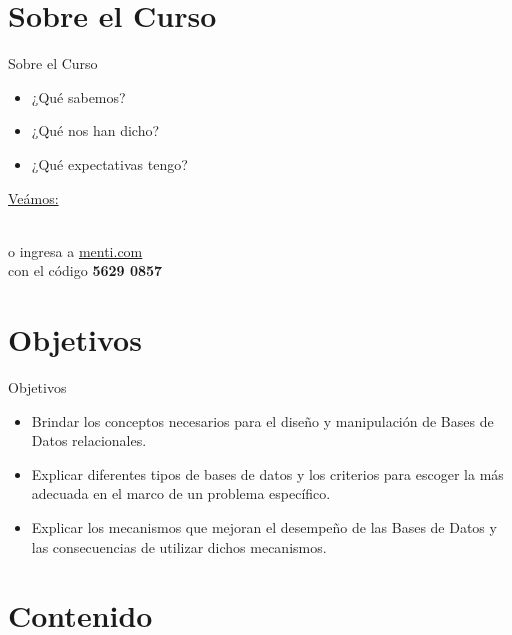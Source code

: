 \documentclass[aspectratio=169]{beamer}
\begin{document}
\section{Sobre el Curso}

\begin{frame}{Sobre el Curso}
\begin{itemize}
    \item ¿Qué sabemos?
    \item ¿Qué nos han dicho?
    \item ¿Qué expectativas tengo?
\end{itemize}

    \centering
    \vspace{10mm}
    {\small \href{https://www.mentimeter.com/app/presentation/aljzuorbyosmeh7v9vvh4ik9e9y3zdcn/edit}{Veámos:}}\\
    \vspace{2mm}
  
    \\
    \vspace{2mm}
    \footnotesize  o ingresa a \href{https://www.menti.com/alqgaa5yhyd4}{menti.com}\\ con el código \textbf{5629 0857}
\end{frame}

\section{Objetivos}

\begin{frame}{Objetivos}
\begin{itemize}
    \item Brindar los conceptos necesarios para el diseño y manipulación de Bases de Datos relacionales.
    \item Explicar diferentes tipos de bases de datos y los criterios para escoger la más adecuada en el marco de un problema específico.
    \item Explicar los mecanismos que mejoran el desempeño de las Bases de Datos y las consecuencias de utilizar dichos mecanismos.
\end{itemize}
\end{frame}

\section{Contenido}
\end{document}
